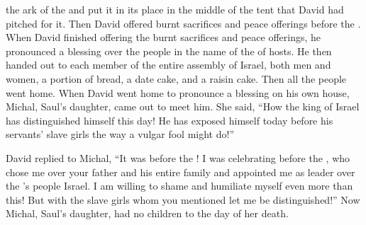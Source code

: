 {the ark
of the {}
and put
it in its place
in the middle
of the tent
that
David
had pitched
for it. Then David
offered
burnt sacrifices
and peace offerings
before
the {}.
When David
finished
offering
the burnt sacrifices
and peace offerings,
he pronounced a blessing
over the
people
in the name
of the {}
of hosts.
He then handed out
to each
member
of the entire
assembly
of Israel,
both men
and women,
a portion
of bread,
a date cake,
and a
raisin cake.
Then
all
the people
went
home.
When David
went home
to pronounce a blessing
on his own house,
Michal,
Saul’s
daughter,
came out to meet
him.
She said,
“How
the king
of Israel
has
distinguished
himself this day! He has exposed
himself today
before
his servants’
slave girls
the way a vulgar fool might do!”
\par }{\PP {}David
replied
to
Michal,
“It was before
the {}! I was celebrating
before
the {},
who
chose
me over
your father
and his entire
family
and appointed
me as leader
over
the
{}’s
people
Israel.
I am
willing to shame
and humiliate
myself even more
than this! But with
the slave girls
whom
you mentioned
let me
be distinguished!”
Now Michal,
Saul’s
daughter,
had no
children
to
the day
of her death.

}
